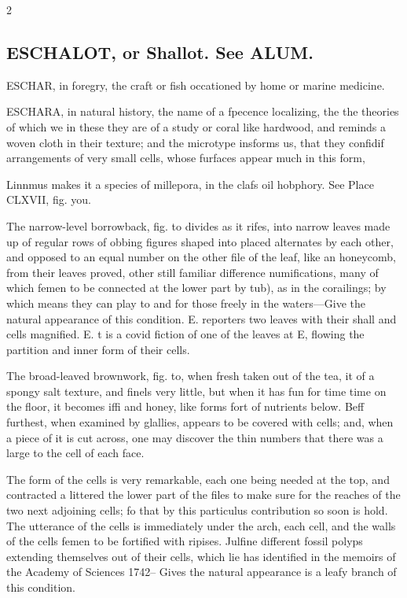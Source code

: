 \documentclass[10pt]{article}
\begin{document}
\begin{multicols}{2}
\subsection*{ESCHALOT, or Shallot. See ALUM.}
ESCHAR, in foregry, the craft or fish occationed by home or marine medicine.

ESCHARA, in natural history, the name of a fpecence localizing, the the theories of which we in these they are of a study or coral like hardwood, and reminds a woven cloth in their texture; and the microtype insforms us, that they confidif arrangements of very small cells, whose furfaces appear much in this form,

Linnmus makes it a species of millepora, in the clafs oil hobphory. See Place CLXVII, fig. you.

The narrow-level borrowback, fig. to divides as it rifes, into narrow leaves made up of regular rows of obbing figures shaped into placed alternates by each other, and opposed to an equal number on the other file of the leaf, like an honeycomb, from their leaves proved, other still familiar difference numifications, many of which femen to be connected at the lower part by tub), as in the corailings; by which means they can play to and for those freely in the waters—Give the natural appearance of this condition. E. reporters two leaves with their shall and cells magnified. E. t is a covid fiction of one of the leaves at E, flowing the partition and inner form of their cells.

The broad-leaved brownwork, fig. to, when fresh taken out of the tea, it of a spongy salt texture, and finels very little, but when it has fun for time time on the floor, it becomes iffi and honey, like forms fort of nutrients below. Beff furthest, when examined by glallies, appears to be covered with cells; and, when a piece of it is cut across, one may discover the thin numbers that there was a large to the cell of each face.

The form of the cells is very remarkable, each one being needed at the top, and contracted a littered the lower part of the files to make sure for the reaches of the two next adjoining cells; fo that by this particulus contribution so soon is hold. The utterance of the cells is immediately under the arch, each cell, and the walls of the cells femen to be fortified with ripises. Julfine different fossil polyps extending themselves out of their cells, which lie has identified in the memoirs of the Academy of Sciences 1742-- Gives the natural appearance is a leafy branch of this condition.


\end{multicols}
\end{document}
